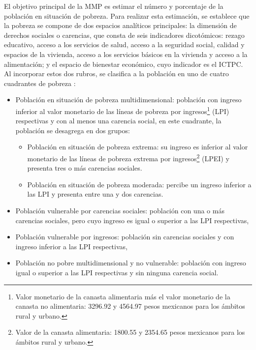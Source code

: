 \documentclass[11pt]{article}
\begin{document}
El objetivo principal de la MMP es estimar el número y porcentaje de la población en situación de pobreza. Para realizar esta estimación, se establece que la pobreza se compone de dos espacios analíticos principales: la dimensión de derechos sociales o carencias, que consta de seis indicadores dicotómicos: rezago educativo, acceso a los servicios de salud, acceso a la seguridad social, calidad y espacios de la vivienda, acceso a los servicios básicos en la vivienda y acceso a la alimentación; y el espacio de bienestar económico, cuyo indicador es el ICTPC. Al incorporar estos dos rubros, se clasifica a la población en uno de cuatro cuadrantes de pobreza \parencite{inegi-reporte:2025, coneval:2020}:
\begin{itemize}
\item[I.] Población en situación de pobreza multidimensional: población con ingreso inferior al
valor monetario de las líneas de pobreza por ingresos\footnote{Valor monetario de la canasta alimentaria más el valor monetario de la canasta no alimentaria: 3296.92 y 4564.97 pesos mexicanos para los ámbitos rural y urbano.} (LPI) respectivas y con al menos una carencia social, en este cuadrante, la población se desagrega en dos grupos:
\begin{itemize}
\item [I$^\prime$.] Población en situación de pobreza extrema: su ingreso es inferior al valor monetario de las líneas de pobreza extrema por ingresos\footnote{Valor de la canasta alimentaria: 1800.55 y 2354.65 pesos mexicanos para los ámbitos rural y urbano.} (LPEI) y presenta tres o más carencias sociales.
\item[I'.] Población en situación de pobreza moderada: percibe un ingreso inferior a las LPI y presenta entre una y dos carencias.
\end{itemize}
\item[II.] Población vulnerable por carencias sociales: población con una o más carencias
sociales, pero cuyo ingreso es igual o superior a las LPI respectivas, 
\item [III.] Población vulnerable por ingresos: población sin carencias sociales y con ingreso
inferior a las LPI respectivas,
\item[IV.] Población no pobre multidimensional y no vulnerable: población con ingreso igual o
superior a las LPI respectivas y sin ninguna carencia social.
\end{itemize}
\end{document}
